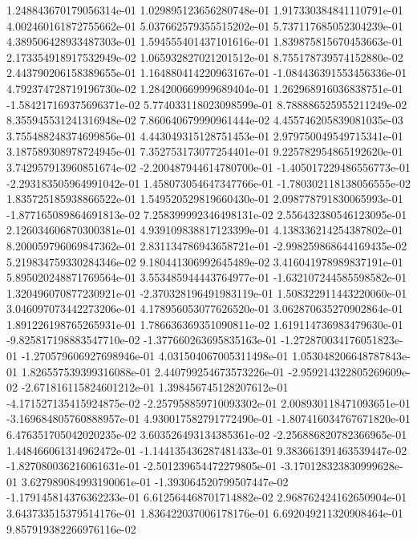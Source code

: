 1.248843670179056314e-01	1.029895123656280748e-01	1.917330384841110791e-01	4.002460161872755662e-01	5.037662579355515202e-01	5.737117685052304239e-01	4.389506428933487303e-01	1.594555401437101616e-01	1.839875815670453663e-01	2.173354918917532949e-02	1.065932827021201512e-01	8.755178739574152880e-02	2.443790206158389655e-01	1.164880414220963167e-01	-1.084436391553456336e-01	4.792374728719196730e-02	1.284200669999689404e-01	1.262968916036838751e-01	-1.584217169375696371e-02	5.774033118023098599e-01	8.788886525955211249e-02	8.355945531241316948e-02	7.860640679990961444e-02	4.455746205839081035e-03	3.755488248374699856e-01	4.443049315128751453e-01	2.979750049549715341e-01	3.187589308978724945e-01	7.352753173077254401e-01	9.225782954865192620e-01	3.742957913960851674e-02	-2.200487944614780700e-01	-1.405017229486556773e-01	-2.293183505964991042e-01	1.458073054647347766e-01	-1.780302118138056555e-02	1.835725185938866522e-01	1.549520529819660430e-01	2.098778791830065993e-01	-1.877165089864691813e-02	7.258399992346498131e-02	2.556432380546123095e-01	2.126034606870300381e-01	4.939109838817123399e-01	4.138336214254387802e-01	8.200059796069847362e-01	2.831134786943658721e-01	-2.998259868644169435e-02	5.219834759330284346e-02	9.180441306992645489e-02	3.416041978989837191e-01	5.895020248871769564e-01	3.553485944443764977e-01	-1.632107244585598582e-01	1.320496070877230921e-01	-2.370328196491983119e-01	1.508322911443220060e-01	3.046097073442273206e-01	4.178956053077626520e-01	3.062870635270902864e-01	1.891226198765265931e-01	1.786636369351090811e-02	1.619114736983479630e-01	-9.825817198883547710e-02	-1.377660263695835163e-01	-1.272870034176051823e-01	-1.270579606927698946e-01	4.031504067005311498e-01	1.053048206648787843e-01	1.826557539399316088e-01	2.440799254673573226e-01	-2.959214322805269609e-02	-2.671816115824601212e-01	1.398456745128207612e-01	-4.171527135415924875e-02	-2.257958859710093302e-01	2.008930118471093651e-01	-3.169684805760888957e-01	4.930017582791772490e-01	-1.807416034767671820e-01	6.476351705042020235e-02	3.603526493134385361e-02	-2.256886820782366965e-01	1.448466061314962472e-01	-1.144135436287481433e-01	9.383661391463539447e-02	-1.827080036216061631e-01	-2.501239654472279805e-01	-3.170128323830999628e-01	3.627989084993190061e-01	-1.393064520799507447e-02	-1.179145814376362233e-01	6.612564468701714882e-02	2.968762424162650904e-01	3.643733515379514176e-01	1.836422037006178176e-01	6.692049211320908464e-01	9.857919382266976116e-02
